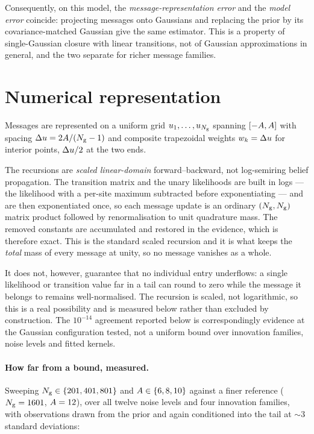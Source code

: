 

Consequently, on this model, the \emph{message-representation error} and the \emph{model error}
coincide: projecting messages onto Gaussians and replacing the prior by its covariance-matched
Gaussian give the same estimator. This is a property of single-Gaussian closure with linear
transitions, not of Gaussian approximations in general, and the two separate for richer message
families.

\section{Numerical representation}
\label{app:numerics}

Messages are represented on a uniform grid $u_{1},\dots,u_{N_{\mathrm{g}}}$ spanning
$[-A,A]$ with spacing $\Delta u = 2A/(N_{\mathrm{g}}-1)$ and composite
trapezoidal weights $w_k = \Delta u$ for interior points, $\Delta u/2$ at the two ends.

The recursions are \emph{scaled linear-domain} forward--backward, not log-semiring belief
propagation. The transition matrix and the unary likelihoods are built in logs --- the likelihood
with a per-site maximum subtracted before exponentiating --- and are then exponentiated once, so
each message update is an ordinary $(N_{\mathrm{g}},N_{\mathrm{g}})$ matrix product followed by renormalisation to
unit quadrature mass. The removed constants are accumulated and restored in the evidence, which is
therefore exact. This is the standard scaled recursion and it is what keeps the \emph{total} mass
of every message at unity, so no message vanishes as a whole.

It does not, however, guarantee that no individual entry underflows: a single likelihood or
transition value far in a tail can round to zero while the message it belongs to remains
well-normalised. The recursion is scaled, not logarithmic, so this is a real possibility and is
measured below rather than excluded by construction. The $10^{-14}$ agreement reported below is
correspondingly evidence at the Gaussian configuration tested, not a uniform bound over innovation
families, noise levels and fitted kernels.

\paragraph{How far from a bound, measured.} Sweeping $N_{\mathrm{g}}\in\{201,401,801\}$ and
$A\in\{6,8,10\}$ against a finer reference ($N_{\mathrm{g}}=1601$, $A=12$), over all
twelve noise levels and four innovation families, with observations drawn from the prior and again
conditioned into the tail at ${\sim}3$ standard deviations:

